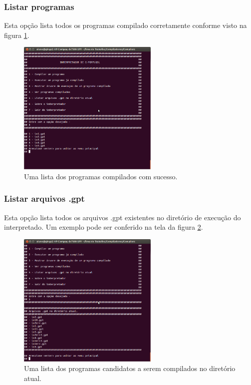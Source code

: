 \documentclass[a4paper,12pt]{report}
\begin{document}
\subsubsection{Listar programas}

  Esta op\c{c}\~ao lista todos os programas compilado corretamente conforme visto na figura \ref{fig:listcomp}.

\begin{figure}
\centering
\includegraphics[width=0.6\textwidth]{imgs/Programas_compilados.png}
\caption{\label{fig:listcomp}Uma lista dos programas compilados com sucesso.}
\end{figure}

\subsubsection{Listar arquivos .gpt}

Esta op\c{c}\~ao lista todos os arquivos .gpt existentes no diret\'orio de execu\c{c}\~ao do interpretado. Um exemplo pode ser conferido na tela da figura \ref{fig:listarqv}.

\begin{figure}
\centering
\includegraphics[width=0.6\textwidth]{imgs/Listar_programas.png}
\caption{\label{fig:listarqv}Uma lista dos programas candidatos a serem compilados no diret\'orio atual.}
\end{figure}
\end{document}
